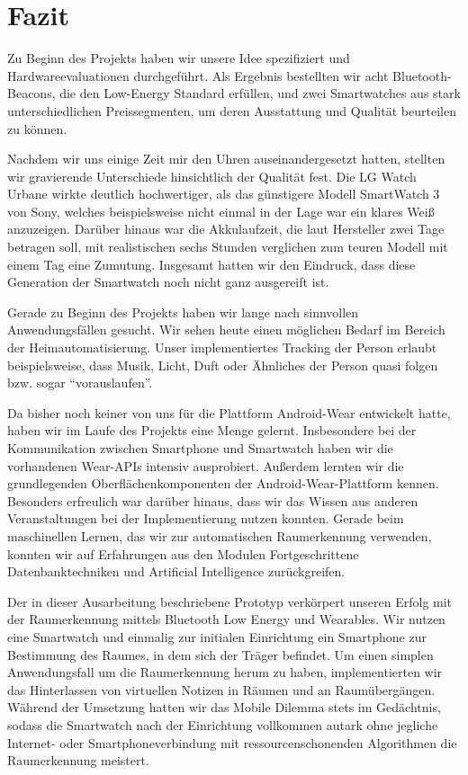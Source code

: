 \section{Fazit}
Zu Beginn des Projekts haben wir unsere Idee spezifiziert und Hardwareevaluationen durchgeführt. Als Ergebnis bestellten wir acht Bluetooth-Beacons, die den Low-Energy Standard erfüllen, und zwei Smartwatches aus stark unterschiedlichen Preissegmenten, um deren Ausstattung und Qualität beurteilen zu können.

Nachdem wir uns einige Zeit mir den Uhren auseinandergesetzt hatten, stellten wir gravierende Unterschiede hinsichtlich der Qualität fest. Die LG Watch Urbane wirkte deutlich hochwertiger, als das günstigere Modell SmartWatch 3 von Sony, welches beispielsweise nicht einmal in der Lage war ein klares Weiß anzuzeigen. Darüber hinaus war die Akkulaufzeit, die laut Hersteller zwei Tage betragen soll, mit realistischen sechs Stunden verglichen zum teuren Modell mit einem Tag eine Zumutung. Insgesamt hatten wir den Eindruck, dass diese Generation der Smartwatch noch nicht ganz ausgereift ist. 

Gerade zu Beginn des Projekts haben wir lange nach sinnvollen Anwendungsfällen gesucht. Wir sehen heute einen möglichen Bedarf im Bereich der Heimautomatisierung. Unser implementiertes Tracking der Person erlaubt beispielsweise, dass Musik, Licht, Duft oder Ähnliches der Person quasi folgen bzw. sogar "`vorauslaufen"'.

Da bisher noch keiner von uns für die Plattform Android-Wear entwickelt hatte, haben wir im Laufe des Projekts eine Menge gelernt. Insbesondere bei der Kommunikation zwischen Smartphone und Smartwatch haben wir die vorhandenen Wear-APIs intensiv ausprobiert. Außerdem lernten wir die grundlegenden Oberflächenkomponenten der Android-Wear-Plattform kennen. Besonders erfreulich war darüber hinaus, dass wir das Wissen aus anderen Veranstaltungen bei der Implementierung nutzen konnten. Gerade beim maschinellen Lernen, das wir zur automatischen Raumerkennung verwenden, konnten wir auf Erfahrungen aus den Modulen Fortgeschrittene Datenbanktechniken und Artificial Intelligence zurückgreifen.

Der in dieser Ausarbeitung beschriebene Prototyp verkörpert unseren Erfolg mit der Raumerkennung mittels Bluetooth Low Energy und Wearables. Wir nutzen eine Smartwatch und einmalig zur initialen Einrichtung ein Smartphone zur Bestimmung des Raumes, in dem sich der Träger befindet. Um einen simplen Anwendungsfall um die Raumerkennung herum zu haben, implementierten wir das Hinterlassen von virtuellen Notizen in Räumen und an Raumübergängen. Während der Umsetzung hatten wir das Mobile Dilemma stets im Gedächtnis, sodass die Smartwatch nach der Einrichtung vollkommen autark ohne jegliche Internet- oder Smartphoneverbindung mit ressourcenschonenden Algorithmen die Raumerkennung meistert.

